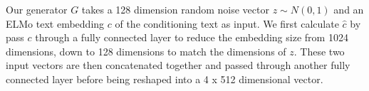 Our generator $G$ takes a 128 dimension random noise vector $z \sim N(0, 1)$ and an ELMo text embedding $c$ of the conditioning text as input. We first calculate $\hat{c}$ by pass $c$ through a fully connected layer to reduce the embedding size from 1024 dimensions, down to 128 dimensions to match the dimensions of $z$. These two input vectors are then concatenated together and passed through another fully connected layer before being reshaped into a 4 x 512 dimensional vector.